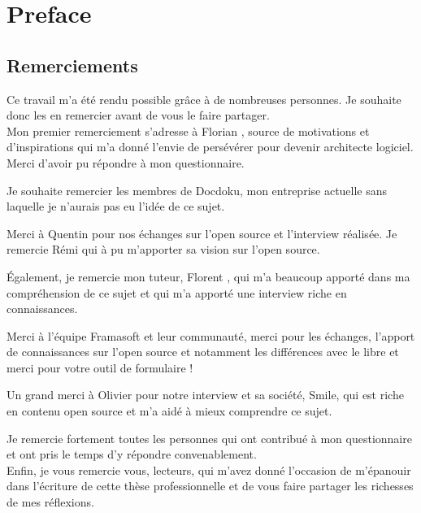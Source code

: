 \chapter*{{Preface}}
	\section*{Remerciements}

	Ce travail m'a été rendu possible grâce à de nombreuses personnes. Je souhaite donc les en remercier avant de vous le faire partager.\\

	Mon premier remerciement s'adresse à Florian , source de motivations et d'inspirations qui m'a donné l'envie de persévérer pour devenir architecte logiciel. Merci d'avoir pu répondre à mon questionnaire.

	Je souhaite remercier les membres de Docdoku, mon entreprise actuelle sans laquelle je n'aurais pas eu l'idée de ce sujet.

	Merci à Quentin  pour nos échanges sur l'open source et l'interview réalisée.
	Je remercie Rémi  qui à pu m'apporter sa vision sur l'open source.

	Également, je remercie mon tuteur, Florent , qui m'a beaucoup apporté dans ma compréhension de ce sujet et qui m'a apporté une interview riche en connaissances.

	Merci à l'équipe Framasoft et leur communauté, merci pour les échanges, l'apport de connaissances sur l'open source et notamment les différences avec le libre et merci pour votre outil de formulaire !

	Un grand merci à Olivier  pour notre interview et sa société, Smile, qui est riche en contenu open source et m'a aidé à mieux comprendre ce sujet.

	Je remercie fortement toutes les personnes qui ont contribué à mon questionnaire et ont pris le temps d'y répondre convenablement.\\

	Enfin, je vous remercie vous, lecteurs, qui m'avez donné l'occasion de m'épanouir dans l'écriture de cette thèse professionnelle et de vous faire partager les richesses de mes réflexions.

